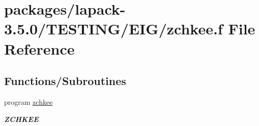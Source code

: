 \hypertarget{zchkee_8f}{}\section{packages/lapack-\/3.5.0/\+T\+E\+S\+T\+I\+N\+G/\+E\+I\+G/zchkee.f File Reference}
\label{zchkee_8f}
\subsection*{Functions/\+Subroutines}
\begin{DoxyCompactItemize}
\item 
program \hyperlink{group__complex16__eig_gae499dac46ffdbb5251d1221610866e68}{zchkee}
\begin{DoxyCompactList}\small\item\em {\bfseries Z\+C\+H\+K\+E\+E} \end{DoxyCompactList}\end{DoxyCompactItemize}
